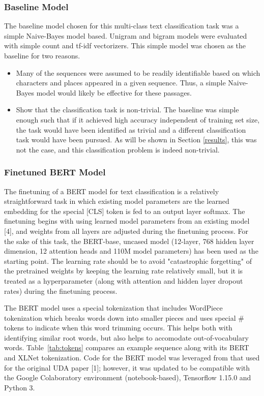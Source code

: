 \documentclass[twoside,twocolumn,10pt]{article}
\begin{document}
\subsubsection{Baseline Model}
The baseline model chosen for this multi-class text classification task was a simple Naive-Bayes model based. Unigram and bigram models were evaluated with simple count and tf-idf vectorizers. This simple model was chosen as the baseline for two reasons.
\begin{itemize}
 	\item Many of the sequences were assumed to be readily identifiable based on which characters and places appeared in a given sequence. Thus, a simple Naive-Bayes model would likely be effective for these passages.
 	\item Show that the classification task is non-trivial. The baseline was simple enough such that if it achieved high accuracy independent of training set size, the task would have been identified as trivial and a different classification task would have been pursued. As will be shown in Section \ref{results}, this was not the case, and this classification problem is indeed non-trivial. 
 \end{itemize}


\subsubsection{Finetuned BERT Model}

The finetuning of a BERT model for text classification is a relatively straightforward task in which existing model parameters are the learned embedding for the special [CLS] token is fed to an output layer softmax. The finetuning begins with using learned model parameters from an existing model [4], and weights from all layers are adjusted during the finetuning process. For the sake of this task, the BERT-base, uncased model (12-layer, 768 hidden layer dimension, 12 attention heads and 110M model parameters) has been used as the starting point. The learning rate should be to avoid "catastrophic forgetting" of the pretrained weights by keeping the learning rate relatively small, but it is treated as a hyperparameter (along with attention and hidden layer dropout rates) during the finetuning process.

The BERT model uses a special tokenization that includes WordPiece tokenization \cite{Schuster and Nakajima:2012} which breaks words down into smaller pieces and uses special \# tokens to indicate when this word trimming occurs. This helps both with identifying similar root words, but also helps to accomodate out-of-vocabulary words. Table~\ref{tab:tokens} compares an example sequence along with its BERT and XLNet tokenization. Code for the BERT model was leveraged from that used for the original UDA paper [1]; however, it was updated to be compatible with the Google Colaboratory environment (notebook-based), Tensorflow 1.15.0 and Python 3.  
\end{document}
